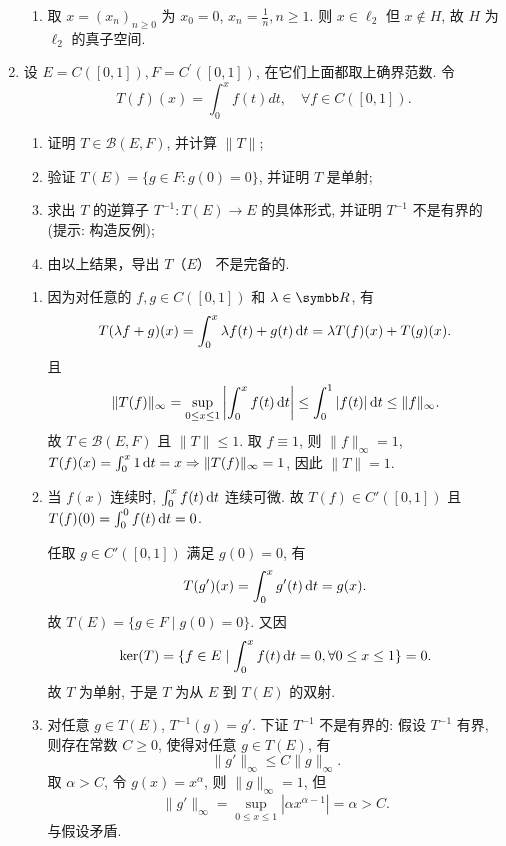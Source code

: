 \begin{enumerate}
\begin{answer}
\begin{enumerate}
        \item  取 $x=(x_n)_{n\geq 0}$ 为 $x_0=0$, $x_n=\frac{1}{n},n\geq 1$. 则 $x\in\ell_2$ 但
        $x\notin H$, 故 $H$ 为 $\ell_2$ 的真子空间.
      \end{enumerate}
    \end{answer}
  \item 设 $E=C([0,1]), F=C^{\prime}([0,1])$, 在它们上面都取上确界范数. 令
  \[
    T(f)(x)=\int_{0}^{x} f(t) d t, \quad \forall f \in C([0,1]) .
  \]
    \begin{enumerate}
      \item 证明 $T \in \mathcal{B}(E, F)$, 并计算 $\|T\|$;
      \item 验证 $T(E)=\{g \in F: g(0)=0\}$, 并证明 $T$ 是单射;
      \item 求出 $T$ 的逆算子 $T^{-1}: T(E) \rightarrow E$ 的具体形式, 并证明 $T^{-1}$ 不是有界的 (提示: 构造反例);
      \item 由以上结果，导出 $T（E）$ 不是完备的.
    \end{enumerate}
    \begin{answer}
      \begin{enumerate}
        \item 因为对任意的 $f,g\in C([0,1])$ 和 $\lambda\in\R$, 有
        \[T(\lambda f+g)(x)=\int_0^x \lambda f(t)+g(t)\mathop{}\!\mathrm{d} t=\lambda T(f)(x)+T(g)(x).\]
        且
        \[\|T(f)\|_{\infty}=\sup_{0\leq x\leq 1}\left|\int_0^x f(t)\mathop{}\!\mathrm{d} t\right|\leq\int_0^1 |f(t)|\mathop{}\!\mathrm{d} t\leq\|f\|_{\infty}.\]
        故 $T\in\mathcal{B}(E,F)$ 且 $\|T\|\leq 1$. 取 $f\equiv 1$, 则 $\|f\|_{\infty}=1$,
        $T(f)(x)=\int_0^x 1\mathop{}\!\mathrm{d} t=x\Rightarrow\|T(f)\|_{\infty}=1$, 因此 $\|T\|=1$.
    
        \item 当 $f(x)$ 连续时, $\int_0^x f(t)\mathop{}\!\mathrm{d} t$ 连续可微.
        故 $T(f)\in C'([0,1])$ 且 $T(f)(0)=\int_0^0 f(t)\mathop{}\!\mathrm{d} t=0$.
    
        任取 $g\in C'([0,1])$ 满足 $g(0)=0$, 有
        \[T(g')(x)=\int_0^x g'(t)\mathop{}\!\mathrm{d} t=g(x).\]
        故 $T(E)=\{g\in F\mid g(0)=0\}$. 又因
        \[\ker(T)=\{f\in E\mid \int_0^x f(t)\mathop{}\!\mathrm{d} t=0, \forall 0\leq x\leq 1\}=0.\]
        故 $T$ 为单射, 于是 $T$ 为从 $E$ 到 $T(E)$ 的双射.
    
        \item 对任意 $g\in T(E)$, $T^{-1}(g)=g'$. 下证 $T^{-1}$ 不是有界的:
        假设 $T^{-1}$ 有界, 则存在常数 $C\geq 0$, 使得对任意 $g\in T(E)$, 有
        \[\|g'\|_{\infty}\leq C\|g\|_{\infty}.\]
        取 $\alpha>C$, 令 $g(x)=x^{\alpha}$, 则 $\|g\|_{\infty}=1$, 但
        \[\|g'\|_{\infty}=\sup_{0\leq x\leq 1}|\alpha x^{\alpha-1}|=\alpha>C.\]
        与假设矛盾.
    

\end{enumerate}
\end{answer}
\end{enumerate}
